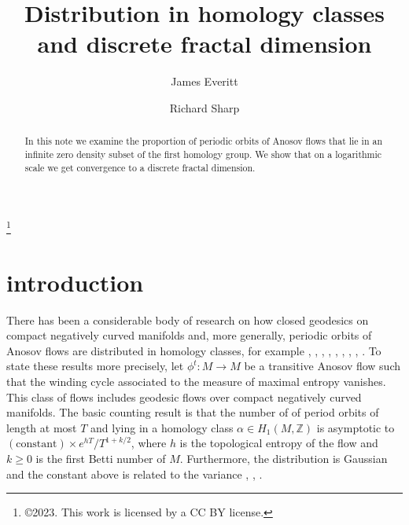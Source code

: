 \documentclass[11pt]{amsart}
\theoremstyle{definition}
\numberwithin{equation}{section}
\numberwithin{theorem}{section}
\def\Z{\mathbb{Z}}
\begin{document}
  
\normalsize

 \title[Distribution in homology classes and discrete fractal dimension]%
{Distribution in homology classes and discrete fractal dimension} 

\author{James Everitt} 

\author{Richard Sharp} 
\address{Mathematics Institute, University of Warwick,
Coventry CV4 7AL, U.K.}




\thanks{\copyright 2023. This work is licensed by a CC BY license.}



\keywords{}



\begin{abstract}
In this note we examine the proportion of periodic orbits of Anosov flows that lie in an
infinite zero density 
subset of the first homology group. We show that on a logarithmic scale we get convergence
to a discrete fractal dimension.
\end{abstract}

\maketitle

%
%
%
%
%
%
%
%
%


\section{introduction}
There has been a considerable body of research on how closed geodesics on compact negatively curved manifolds and, more generally, periodic orbits of Anosov flows are distributed in homology classes, for example \cite{Anan}, \cite{bab-led}, \cite{Katsuda-Sunada87},
\cite{Katsuda-Sunada90}, \cite{Kotani}, \cite{lalley}, \cite{phillips-sarnak}, \cite{Pollicott-Sharp-GD},
\cite{Sharp93}.
To state these results more precisely, let $\phi^t : M \to M$ be a transitive Anosov flow such that the winding cycle associated to the measure of maximal entropy vanishes. This class of flows 
includes
geodesic flows over compact negatively curved manifolds.
The basic counting result is that the number of of period orbits of length at most $T$ and lying in a homology class $\alpha \in H_1(M,\Z)$ is asymptotic to $(\mathrm{constant}) \times e^{hT}/T^{1+k/2}$, where $h$ is the topological entropy of the flow and $k\ge 0$ is the first Betti number of $M$.
Furthermore, the distribution is Gaussian and the constant above is related to the variance
\cite{lalley}, \cite{pet-ris-crelle}, \cite{Sharp04tams}.
\end{document}
